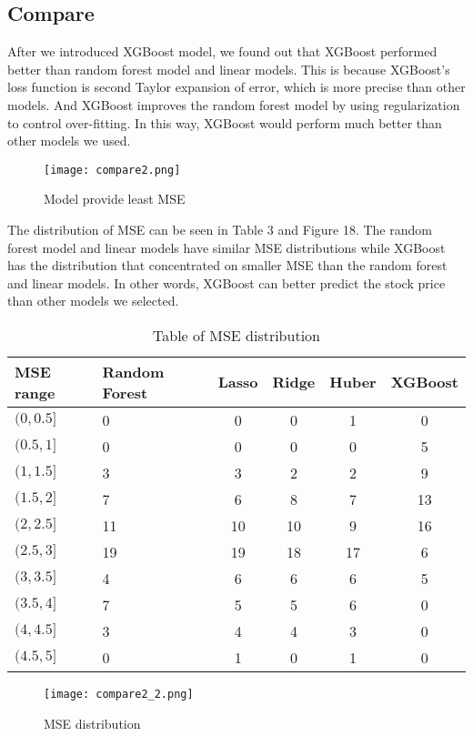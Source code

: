 \documentclass[fleqn,10pt]{SelfArx} %
\begin{document}
\subsection{Compare}
After we introduced XGBoost model, we found out that XGBoost performed better than random forest model and linear models. This is because XGBoost's loss function is second Taylor expansion of error, which is more precise than other models. And XGBoost improves the random forest model by using regularization to control over-fitting. In this way, XGBoost would perform much better than other models we used. \\

\begin{figure}[ht]\centering
\texttt{[image: compare2.png]}
\caption{Model provide least MSE}
\label{fig:results}
\end{figure}

\noindent
The distribution of MSE can be seen in Table 3 and Figure 18. The random forest model and linear models have similar MSE distributions while XGBoost has the distribution that concentrated on smaller MSE than the random forest and linear models. In other words, XGBoost can better predict the stock price than other models we selected.

\begin{table}[hbt]
\caption{Table of MSE distribution}
\centering
\begin{tabular}{m{1cm}<{\centering}|m{1.5cm}<{\centering}|c|c|c|c}
MSE range & Random Forest & Lasso & Ridge & Huber& XGBoost \\
\hline
$(0,0.5]$ & 0&0&0&1&0 \\
$(0.5,1]$ & 0&0&0&0&5\\
$(1,1.5]$ & 3&3&2&2&9 \\
$(1.5,2]$ & 7&6&8&7&13 \\
$(2,2.5]$ & 11&10&10&9&16 \\
$(2.5,3]$ & 19&19&18&17&6 \\
$(3,3.5]$ & 4&6&6&6&5 \\
$(3.5,4]$ & 7&5&5&6&0 \\
$(4,4.5]$ & 3&4&4&3&0 \\
$(4.5,5]$ & 0&1&0&1&0
\end{tabular}
\label{tab:label}
\end{table}

\begin{figure}[ht]\centering
\texttt{[image: compare2\_2.png]}
\caption{MSE distribution}
\label{fig:results}
\end{figure}
\end{document}
